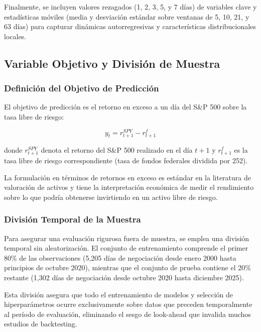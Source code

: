 \documentclass[11pt,a4paper]{article}
\begin{document}
Finalmente, se incluyen valores rezagados (1, 2, 3, 5, y 7 días) de variables clave y estadísticas móviles (media y desviación estándar sobre ventanas de 5, 10, 21, y 63 días) para capturar dinámicas autorregresivas y características distribucionales locales.

\subsection{Variable Objetivo y División de Muestra}

\subsubsection{Definición del Objetivo de Predicción}

El objetivo de predicción es el retorno en exceso a un día del S\&P 500 sobre la tasa libre de riesgo:

\begin{equation}
y_t = r_{t+1}^{SPY} - r_{t+1}^{f}
\end{equation}

donde $r_{t+1}^{SPY}$ denota el retorno del S\&P 500 realizado en el día $t+1$ y $r_{t+1}^{f}$ es la tasa libre de riesgo correspondiente (tasa de fondos federales dividida por 252).

La formulación en términos de retornos en exceso es estándar en la literatura de valoración de activos y tiene la interpretación económica de medir el rendimiento sobre lo que podría obtenerse invirtiendo en un activo libre de riesgo.

\subsubsection{División Temporal de la Muestra}

Para asegurar una evaluación rigurosa fuera de muestra, se emplea una división temporal sin aleatorización. El conjunto de entrenamiento comprende el primer 80\% de las observaciones (5,205 días de negociación desde enero 2000 hasta principios de octubre 2020), mientras que el conjunto de prueba contiene el 20\% restante (1,302 días de negociación desde octubre 2020 hasta diciembre 2025).

Esta división asegura que todo el entrenamiento de modelos y selección de hiperparámetros ocurre exclusivamente sobre datos que preceden temporalmente al período de evaluación, eliminando el sesgo de look-ahead que invalida muchos estudios de backtesting.
\end{document}
